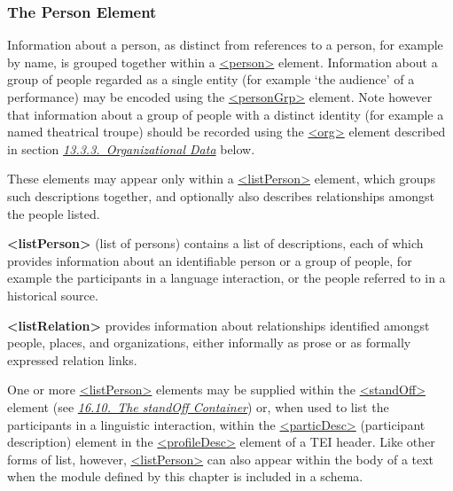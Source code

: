 \subsubsection[{The Person Element}]{The Person Element}\label{NDPERSE}\par
Information about a person, as distinct from references to a person, for example by name, is grouped together within a \hyperref[TEI.person]{<person>} element. Information about a group of people regarded as a single entity (for example ‘the audience’ of a performance) may be encoded using the \hyperref[TEI.personGrp]{<personGrp>} element. Note however that information about a group of people with a distinct identity (for example a named theatrical troupe) should be recorded using the \hyperref[TEI.org]{<org>} element described in section \textit{\hyperref[ND-org]{13.3.3.\ Organizational Data}} below.\par
These elements may appear only within a \hyperref[TEI.listPerson]{<listPerson>} element, which groups such descriptions together, and optionally also describes relationships amongst the people listed. 
\begin{sansreflist}
  
\item [\textbf{<listPerson>}] (list of persons) contains a list of descriptions, each of which provides information about an identifiable person or a group of people, for example the participants in a language interaction, or the people referred to in a historical source.
\item [\textbf{<listRelation>}] provides information about relationships identified amongst people, places, and organizations, either informally as prose or as formally expressed relation links.
\end{sansreflist}
\par
One or more \hyperref[TEI.listPerson]{<listPerson>} elements may be supplied within the \hyperref[TEI.standOff]{<standOff>} element (see \textit{\hyperref[SASOstdf]{16.10.\ The standOff Container}}) or, when used to list the participants in a linguistic interaction, within the \hyperref[TEI.particDesc]{<particDesc>} (participant description) element in the \hyperref[TEI.profileDesc]{<profileDesc>} element of a TEI header. Like other forms of list, however, \hyperref[TEI.listPerson]{<listPerson>} can also appear within the body of a text when the module defined by this chapter is included in a schema.\par
